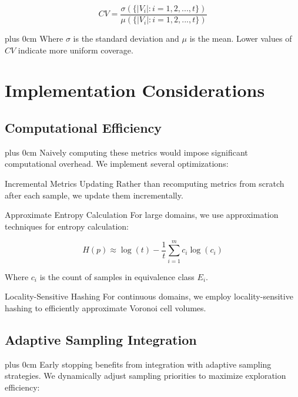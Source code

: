 \documentclass[11pt,a4paper]{article}
\newcommand{\justifytext}{\leftskip=0pt \rightskip=0pt plus 0cm}
\begin{document}
\begin{equation}
CV = \frac{\sigma(\{|V_i| : i = 1,2,...,t\})}{\mu(\{|V_i| : i = 1,2,...,t\})}
\end{equation}

\justifytext
Where $\sigma$ is the standard deviation and $\mu$ is the mean. Lower values of $CV$ indicate more uniform coverage.

\section{Implementation Considerations}

\subsection{Computational Efficiency}

\justifytext
Naively computing these metrics would impose significant computational overhead. We implement several optimizations:

\begin{examplebox}{Incremental Metrics Updating}
Rather than recomputing metrics from scratch after each sample, we update them incrementally.
\end{examplebox}

\begin{examplebox}{Approximate Entropy Calculation}
For large domains, we use approximation techniques for entropy calculation:

\begin{equation}
H(p) \approx \log(t) - \frac{1}{t}\sum_{i=1}^{m}c_i\log(c_i)
\end{equation}

Where $c_i$ is the count of samples in equivalence class $E_i$.
\end{examplebox}

\begin{examplebox}{Locality-Sensitive Hashing}
For continuous domains, we employ locality-sensitive hashing to efficiently approximate Voronoi cell volumes.
\end{examplebox}

\subsection{Adaptive Sampling Integration}

\justifytext
Early stopping benefits from integration with adaptive sampling strategies. We dynamically adjust sampling priorities to maximize exploration efficiency:
\end{document}
